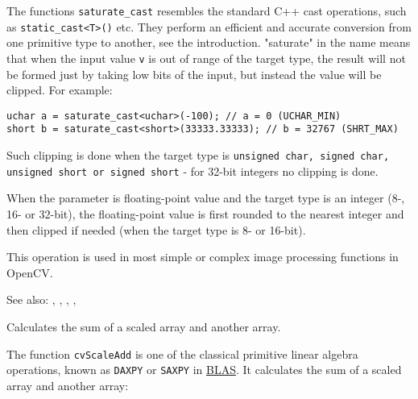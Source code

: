 \begin{description}
\end{description}

The functions \texttt{saturate\_cast} resembles the standard C++ cast operations, such as \texttt{static\_cast<T>()} etc. They perform an efficient and accurate conversion from one primitive type to another, see the introduction. "saturate" in the name means that when the input value \texttt{v} is out of range of the target type, the result will not be formed just by taking low bits of the input, but instead the value will be clipped. For example:

\begin{lstlisting}
uchar a = saturate_cast<uchar>(-100); // a = 0 (UCHAR_MIN)
short b = saturate_cast<short>(33333.33333); // b = 32767 (SHRT_MAX)
\end{lstlisting}

Such clipping is done when the target type is \texttt{unsigned char, signed char, unsigned short or signed short} - for 32-bit integers no clipping is done.

When the parameter is floating-point value and the target type is an integer (8-, 16- or 32-bit), the floating-point value is first rounded to the nearest integer and then clipped if needed (when the target type is 8- or 16-bit).

This operation is used in most simple or complex image processing functions in OpenCV.

See also: , , , , 

Calculates the sum of a scaled array and another array.

\begin{description}
\end{description}

The function \texttt{cvScaleAdd} is one of the classical primitive linear algebra operations, known as \texttt{DAXPY} or \texttt{SAXPY} in \href{http://en.wikipedia.org/wiki/Basic_Linear_Algebra_Subprograms}{BLAS}. It calculates the sum of a scaled array and another array:

